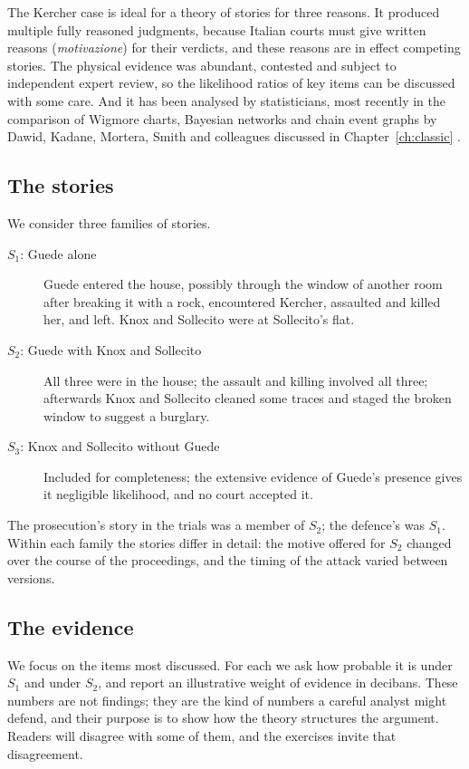 The Kercher case is ideal for a theory of stories for three reasons. It produced multiple fully reasoned judgments, because Italian courts must give written reasons (\emph{motivazione}) for their verdicts, and these reasons are in effect competing stories. The physical evidence was abundant, contested and subject to independent expert review, so the likelihood ratios of key items can be discussed with some care. And it has been analysed by statisticians, most recently in the comparison of Wigmore charts, Bayesian networks and chain event graphs by Dawid, Kadane, Mortera, Smith and colleagues discussed in Chapter~\ref{ch:classic} \citep{dawid2024kercher}.

\subsection{The stories}

We consider three families of stories.
\begin{description}
\item[$S_1$: Guede alone] Guede entered the house, possibly through the window of another room after breaking it with a rock, encountered Kercher, assaulted and killed her, and left. Knox and Sollecito were at Sollecito's flat.
\item[$S_2$: Guede with Knox and Sollecito] All three were in the house; the assault and killing involved all three; afterwards Knox and Sollecito cleaned some traces and staged the broken window to suggest a burglary.
\item[$S_3$: Knox and Sollecito without Guede] Included for completeness; the extensive evidence of Guede's presence gives it negligible likelihood, and no court accepted it.
\end{description}
The prosecution's story in the trials was a member of $S_2$; the defence's was $S_1$. Within each family the stories differ in detail: the motive offered for $S_2$ changed over the course of the proceedings, and the timing of the attack varied between versions.

\subsection{The evidence}

We focus on the items most discussed. For each we ask how probable it is under $S_1$ and under $S_2$, and report an illustrative weight of evidence in decibans. These numbers are not findings; they are the kind of numbers a careful analyst might defend, and their purpose is to show how the theory structures the argument. Readers will disagree with some of them, and the exercises invite that disagreement.

